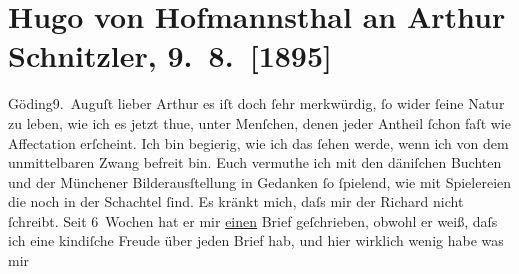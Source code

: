

         
         \renewcommand{\erwaehntePersonen}{Personen: Richard Beer-Hofmann, Fedor Mamroth}
         \renewcommand{\erwaehnteInstitutionen}{Institutionen: Frankfurter Zeitung}
         \renewcommand{\erwaehnteOrte}{Orte: Dänemark, Hodonín, München, Stockerau, Wien, Znaim}
         \renewcommand{\erwaehnteWerke}{}
               \section[Hugo von Hofmannsthal an Arthur Schnitzler, 9. 8. {[}1895{]}]{ Hugo von Hofmannsthal an Arthur Schnitzler, 9. 8. {[}1895{]}}\nopagebreak{}\rehead{ }\begin{ledgroupsized}[t]{13cm}\normalsize\beginnumbering \toendnotes[C]{\smallbreak\pagebreak[2]} 
\toendnotes[C]{\smallbreak}\pstart
           \raggedleft{}{\pb}Göding9. Auguſt\pend
           \pstart{}lieber Arthur\pend\pstart
           es iſt doch ſehr merkwürdig, ſo wider ſeine Natur zu leben, wie ich es jetzt thue,
               unter Menſchen, denen jeder Antheil ſchon faſt wie Affectation erſcheint. Ich bin
               begierig, wie ich das ſehen werde, wenn ich von dem unmittelbaren Zwang befreit bin.
               Euch vermuthe ich mit den däniſchen Buchten und
               der Münchener Bilderausſtellung in {\pb}Gedanken ſo ſpielend, wie mit
               Spielereien die noch in der Schachtel ſind. Es kränkt mich, daſs mir der Richard nicht ſchreibt. Seit 6 Wochen hat er
               mir \uline{einen} Brief geſchrieben, obwohl er weiß, daſs ich
               eine kindiſche Freude über jeden Brief hab, und hier wirklich wenig habe was mir

\end{ledgroupsized}
